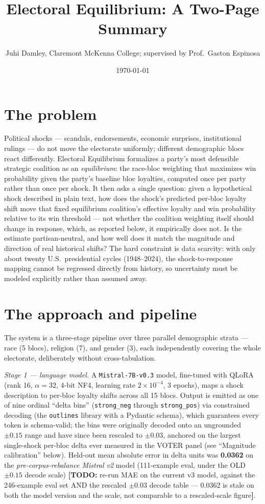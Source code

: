 \documentclass[11pt]{article}
\title{Electoral Equilibrium: A Two-Page Summary}
\author{Juhi Damley, Claremont McKenna College; supervised by
Prof.\ Gaston Espinosa}
\date{\today}
\newcommand{\todo}[1]{{\color{red}\textbf{[TODO:} #1\textbf{]}}}
\begin{document}
\maketitle

\section*{The problem}
Political shocks --- scandals, endorsements, economic surprises, institutional
rulings --- do not move the electorate uniformly; different demographic blocs
react differently. Electoral Equilibrium formalizes a party's most defensible
strategic coalition as an \emph{equilibrium}: the race-bloc weighting that
maximizes win probability given the party's baseline bloc loyalties, computed
once per party rather than once per shock. It then asks a single question:
given a hypothetical shock described in plain text, how does the shock's
predicted per-bloc loyalty shift move that fixed equilibrium coalition's
effective loyalty and win probability relative to its win threshold --- not
whether the coalition weighting itself should change in response, which, as
reported below, it empirically does not. Is the estimate partisan-neutral, and
how well does it match the magnitude and direction of real historical shifts?
The hard constraint is data scarcity: with only about twenty U.S.\ presidential
cycles (1948--2024), the shock-to-response mapping cannot be regressed directly
from history, so uncertainty must be modeled explicitly rather than assumed
away.

\section*{The approach and pipeline}
The system is a three-stage pipeline over three parallel demographic strata ---
race (5 blocs), religion (7), and gender (3), each independently covering the
whole electorate, deliberately without cross-tabulation.

\emph{Stage 1 --- language model.} A \texttt{Mistral-7B-v0.3} model, fine-tuned
with QLoRA (rank 16, $\alpha{=}32$, 4-bit NF4, learning rate $2\times10^{-4}$,
3 epochs), maps a shock description to per-bloc loyalty shifts across all 15
blocs. Output is emitted as one of nine ordinal ``delta bins''
(\texttt{strong\_neg} through \texttt{strong\_pos}) via constrained decoding
(the \texttt{outlines} library with a Pydantic schema), which guarantees every
token is schema-valid; the bins were originally decoded onto an ungrounded
$\pm0.15$ range and have since been rescaled to $\pm0.03$, anchored on the
largest single-shock per-bloc delta ever measured in the VOTER panel (see
``Magnitude calibration'' below). Held-out mean absolute error in delta units
was \textbf{0.0362} on the \emph{pre-corpus-rebalance Mistral v2} model
(111-example eval, under the OLD $\pm0.15$ decode scale)
\todo{re-run MAE on the current v3 model, against the 246-example eval set AND
the rescaled $\pm0.03$ decode table --- 0.0362 is stale on both the model
version and the scale, not comparable to a rescaled-scale figure}.
\end{document}
